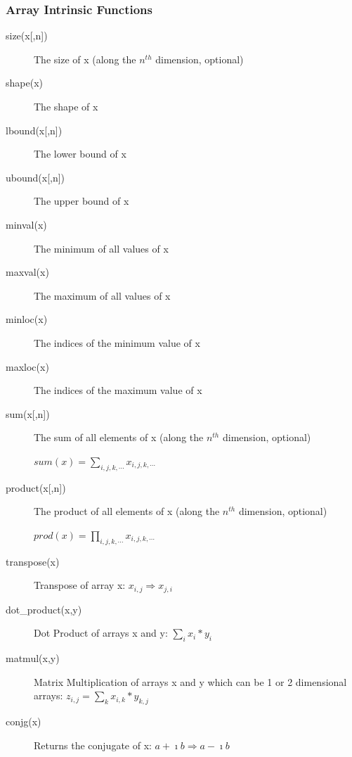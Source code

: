\documentclass[slidestop,mathserif,compress,xcolor=svgnames]{beamer}
\begin{document}
\begin{frame}[allowframebreaks]
  \frametitle{\small Array Intrinsic Functions}
  \begin{block}{}
    \begin{description}
      \item[{size(x[,n])}] The size of x (along the $n^{th}$ dimension, optional)
      \item[shape(x)] The shape of x
      \item[{lbound(x[,n])}] The lower bound of x
      \item[{ubound(x[,n])}] The upper bound of x
      \item[minval(x)] The minimum of all values of x
      \item[maxval(x)] The maximum of all values of x
      \item[minloc(x)] The indices of the minimum value of x
      \item[maxloc(x)] The indices of the maximum value of x
    \end{description}
  \end{block}
  \begin{block}{}
    \begin{description}
      \item[{sum(x[,n])}] The sum of all elements of x (along the $n^{th}$ dimension, optional)
      \item[] $sum(x) = \sum_{i,j,k,\cdots}x_{i,j,k,\cdots}$
      \item[{product(x[,n])}] The product of all elements of x (along the $n^{th}$ dimension, optional)
      \item[] $prod(x) = \prod_{i,j,k,\cdots}x_{i,j,k,\cdots}$
      \item[transpose(x)] Transpose of array x: $ x_{i,j}\Rightarrow x_{j,i}$
      \item[dot\_product(x,y)] Dot Product of arrays x and y: $ \sum_{i} x_i* y_i $
      \item[matmul(x,y)] Matrix Multiplication of arrays x and y which can be 1 or 2 dimensional arrays: $ z_{i,j} = \sum_k x_{i,k} * y_{k,j}$
      \item[conjg(x)] Returns the conjugate of x: $ a + \imath b \Rightarrow a - \imath b$
    \end{description}
  \end{block}
\end{frame}
\end{document}

